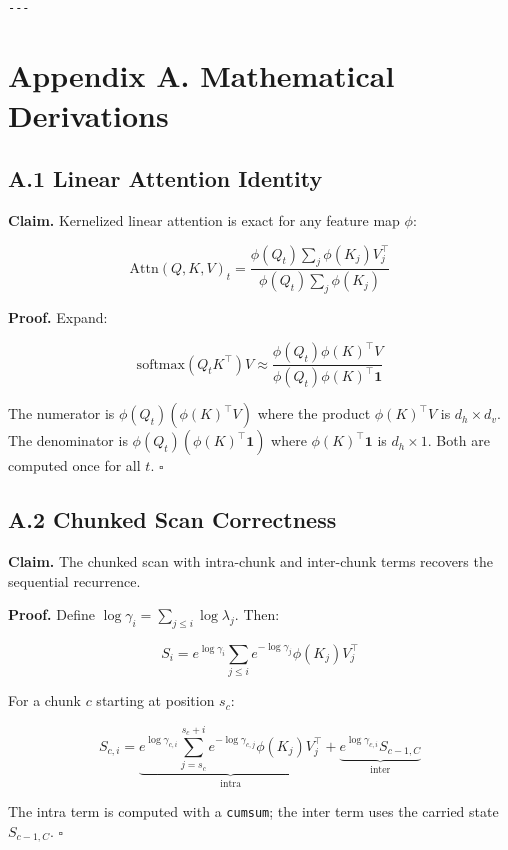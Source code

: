 \begin{lstlisting}

---
\end{lstlisting}


\section{Appendix A. Mathematical Derivations}

\subsection{A.1 Linear Attention Identity}

\textbf{Claim.} Kernelized linear attention is exact for any feature map $\phi$:

\[
\text{Attn}(Q, K, V)_t = \frac{\phi(Q_t) \sum_j \phi(K_j) V_j^\top}{\phi(Q_t) \sum_j \phi(K_j)}
\tag{A.1}
\]

\textbf{Proof.} Expand:

\[
\text{softmax}(Q_t K^\top) V \approx \frac{\phi(Q_t) \phi(K)^\top V}{\phi(Q_t) \phi(K)^\top \mathbf{1}}
\]

The numerator is $\phi(Q_t) (\phi(K)^\top V)$ where the product 
$\phi(K)^\top V$ is $d_h \times d_v$. The denominator is 
$\phi(Q_t) (\phi(K)^\top \mathbf{1})$ where $\phi(K)^\top \mathbf{1}$ is 
$d_h \times 1$. Both are computed once for all $t$. $\square$

\subsection{A.2 Chunked Scan Correctness}

\textbf{Claim.} The chunked scan with intra-chunk and inter-chunk terms 
recovers the sequential recurrence.

\textbf{Proof.} Define $\log \gamma_i = \sum_{j \leq i} \log \lambda_j$. Then:

\[
S_i = e^{\log \gamma_i} \sum_{j \leq i} e^{-\log \gamma_j} \phi(K_j) V_j^\top
\tag{A.2}
\]

For a chunk $c$ starting at position $s_c$:

\[
S_{c, i} = \underbrace{e^{\log \gamma_{c, i}} \sum_{j=s_c}^{s_c+i} e^{-\log \gamma_{c, j}} \phi(K_j) V_j^\top}_{\text{intra}} + \underbrace{e^{\log \gamma_{c, i}} S_{c-1, C}}_{\text{inter}}
\tag{A.3}
\]

The intra term is computed with a \texttt{cumsum}; the inter term uses the 
carried state $S_{c-1, C}$. $\square$

